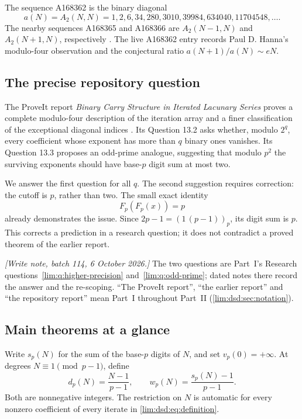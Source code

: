 \documentclass[11pt]{article}
\theoremstyle{definition}
\theoremstyle{remark}
\begin{document}
The sequence A168362 is the binary diagonal
\begin{equation}
 a(N)=A_2(N,N)=1,2,6,34,280,3010,39984,634040,11704548,\ldots.
 \label{lim:dsd:eq:oeis-diagonal}
\end{equation}
The nearby sequences A168365 and A168366 are $A_2(N-1,N)$ and
$A_2(N+1,N)$, respectively \cite{OEIS-A168362,OEIS-A168365,OEIS-A168366}.
The live A168362 entry records Paul D. Hanna's modulo-four observation
and the conjectural ratio $a(N+1)/a(N)\sim eN$.

\subsection{The precise repository question}

The ProveIt report \emph{Binary Carry Structure in Iterated Lacunary
Series} proves a complete modulo-four description of the iteration array
and a finer classification of the exceptional diagonal indices
\cite{dsdrepo}. Its Question 13.2 asks whether, modulo $2^q$, every coefficient
whose exponent has more than $q$ binary ones vanishes. Its Question 13.3
proposes an odd-prime analogue, suggesting that modulo $p^2$ the surviving
exponents should have base-$p$ digit sum at most two.

We answer the first question for all $q$. The second suggestion requires
correction: the cutoff is $p$, rather than two. The small exact identity
\begin{equation}
 [x^{2p-1}]F_p(F_p(x))=p
 \label{lim:dsd:eq:odd-counterexample-intro}
\end{equation}
already demonstrates the issue. Since $2p-1=(1\,(p-1))_p$, its digit
sum is $p$. This corrects a prediction in a research question; it does
not contradict a proved theorem of the earlier report.

\emph{[Write note, batch 114, 6 October 2026.]} The two questions are Part~I's Research
questions~\ref{lim:q:higher-precision} and~\ref{lim:q:odd-prime}; dated
notes there record the answer and the re-scoping. ``The ProveIt report'',
``the earlier report'' and ``the repository report'' mean Part~I throughout
Part~II (\cref{lim:dsd:sec:notation}).

\subsection{Main theorems at a glance}

Write $s_p(N)$ for the sum of the base-$p$ digits of $N$, and set
$v_p(0)=+\infty$. At degrees $N\equiv1\pmod{p-1}$, define
\begin{equation}
 d_p(N)=\frac{N-1}{p-1},\qquad
 w_p(N)=\frac{s_p(N)-1}{p-1}.
 \label{lim:dsd:eq:weights}
\end{equation}
Both are nonnegative integers. The restriction on $N$ is automatic for
every nonzero coefficient of every iterate in \eqref{lim:dsd:eq:definition}.
\end{document}
